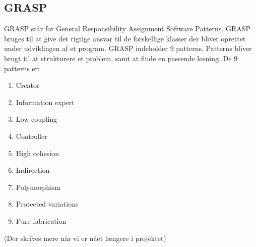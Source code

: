 \subsection{GRASP}
    GRASP står for General Responsibility Assignment Software Patterns. GRASP bruges til at give det rigtige ansvar til de forskellige klasser der bliver oprettet under udviklingen af et program. GRASP indeholder 9 patterns. Patterns bliver brugt til at strukturere et problem, samt at finde en passende løsning. De 9 patterns er:
        \begin{enumerate}
            \item Creator
            \item Information expert
            \item Low coupling
            \item Controller
            \item High cohesion
            \item Indirection
            \item Polymorphism
            \item Protected variations
            \item Pure fabrication
        \end{enumerate}
    (Der skrives mere når vi er nået længere i projektet)
